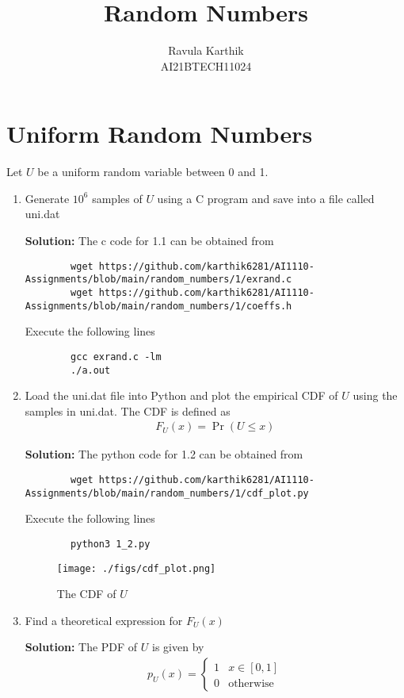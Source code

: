 \documentclass[journal,12pt,twocolumn]{IEEEtran}
\title{Random Numbers }
\author{Ravula Karthik \\ \normalsize AI21BTECH11024 \\ \vspace*{20pt} \normalsize }
\newcommand{\solution}{\noindent \textbf{Solution: }}
\providecommand{\pr}[1]{\ensuremath{\Pr\left(#1\right)}}
\numberwithin{equation}{section}
\renewcommand\thesection{\arabic{section}}
\begin{document}
	\maketitle
	
	\section{Uniform Random Numbers}
	Let $U$ be a uniform random variable between 0 and 1.
	\begin{enumerate}[label=\thesection.\arabic*,ref=\thesection.\theenumi]
	\item Generate $10^6$ samples of $U$ using a C program and save into a file called uni.dat

	\solution The c code for 1.1 can be obtained from
	\begin{lstlisting}
		wget https://github.com/karthik6281/AI1110-Assignments/blob/main/random_numbers/1/exrand.c
		wget https://github.com/karthik6281/AI1110-Assignments/blob/main/random_numbers/1/coeffs.h
	\end{lstlisting}
	Execute the following lines
	\begin{lstlisting}
		gcc exrand.c -lm
		./a.out
	\end{lstlisting}
	\item Load the uni.dat file into Python and plot the empirical CDF of $U$ using the samples in uni.dat. The CDF is defined as
	\begin{align}
		F_{U}(x) = \pr{U \le x}
	\end{align}

	\solution  The python code for 1.2 can be obtained from
	\begin{lstlisting}
		wget https://github.com/karthik6281/AI1110-Assignments/blob/main/random_numbers/1/cdf_plot.py
	\end{lstlisting}
	Execute the following lines
	\begin{lstlisting}
		python3 1_2.py
	\end{lstlisting}
	\begin{figure}
		\centering
		\texttt{[image: ./figs/cdf\_plot.png]}
		\caption{The CDF of $U$}
		\label{fig-1.2}
	\end{figure}
	
	\item Find a  theoretical expression for $F_{U}(x)$
	
	\solution The PDF of $U$ is given by
	\begin{align}
		p_{U}(x) = 
		\begin{cases}
			1 & x \in [0, 1] \\
			0 & \text{otherwise}
		\end{cases}
	\end{align}
	

\end{enumerate}
\end{document}
